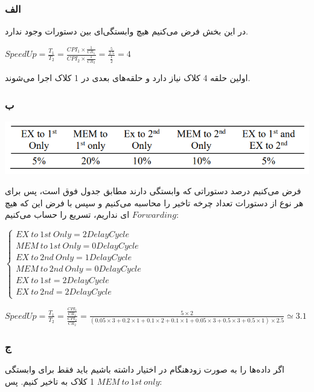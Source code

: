 \subsubsection*{الف}
در این بخش فرض می‌کنیم هیچ وابستگی‌ای بین دستورات وجود ندارد.

\setLTR
$
SpeedUp = \frac{T_1}{T_2} = \frac{CPI_1\times\frac{1}{CR_1}}{CPI_2\times\frac{1}{CR_2}} = \frac{\frac{5}{2.5}}{\frac{1}{2}} = 4
$
\setRTL

اولین حلقه 4 کلاک نیاز دارد و حلقه‌های بعدی در 1 کلاک اجرا می‌شوند.

\subsubsection*{ب}

\setLTR
\qquad \qquad \qquad \qquad \qquad \includegraphics[width=0.5\linewidth]{figs/screenshot001}
\setRTL

فرض می‌کنیم درصد دستوراتی که وابستگی دارند مطابق جدول فوق است، پس برای هر نوع از دستورات تعداد چرخه تاخیر را محاسبه می‌کنیم	و سپس با فرض این که هیچ
$Forwarding$
ای نداریم، تسریع را حساب می‌کنیم:

\setLTR
$
\begin{cases}
	EX \ to \ 1st \ Only = 2 Delay Cycle \\
	MEM \ to \ 1st \ Only = 0 Delay Cycle \\
	EX \ to \ 2nd \ Only = 1 Delay Cycle\\ 
	MEM \ to \ 2nd \ Only = 0 Delay Cycle\\
	EX \ to \ 1st = 2 Delay Cycle\\
	EX \ to \ 2nd =  2 Delay Cycle
	\end{cases}
$

$
SpeedUp = \frac{T_1}{T_2} = \frac{\frac{CPI_1}{CR_1}}{\frac{CPI_2}{CR_2}} = \frac{5\times2}{
(0.05\times3 + 0.2\times1+0.1\times2+0.1\times1+0.05\times3+0.5\times3 + 0.5\times1)\times 2.5
} \simeq 3.1
$
\setRTL


\subsubsection*{ج}

اگر داده‌ها را به صورت زودهنگام در اختیار داشته باشیم باید فقط برای وابستگی 
$MEM \ to \ 1st \ only$
1 کلاک به تاخیر کنیم. پس:

